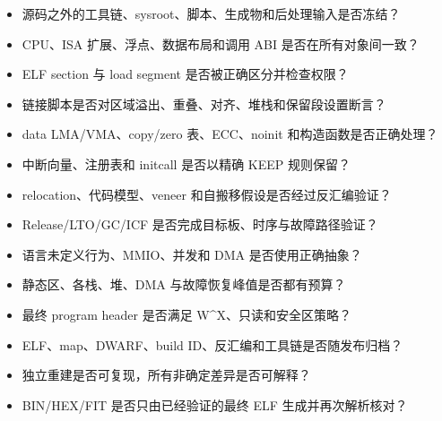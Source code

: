 \begin{itemize}
  \item 源码之外的工具链、sysroot、脚本、生成物和后处理输入是否冻结？
  \item CPU、ISA 扩展、浮点、数据布局和调用 ABI 是否在所有对象间一致？
  \item ELF section 与 load segment 是否被正确区分并检查权限？
  \item 链接脚本是否对区域溢出、重叠、对齐、堆栈和保留段设置断言？
  \item data LMA/VMA、copy/zero 表、ECC、noinit 和构造函数是否正确处理？
  \item 中断向量、注册表和 initcall 是否以精确 KEEP 规则保留？
  \item relocation、代码模型、veneer 和自搬移假设是否经过反汇编验证？
  \item Release/LTO/GC/ICF 是否完成目标板、时序与故障路径验证？
  \item 语言未定义行为、MMIO、并发和 DMA 是否使用正确抽象？
  \item 静态区、各栈、堆、DMA 与故障恢复峰值是否都有预算？
  \item 最终 program header 是否满足 W\textasciicircum X、只读和安全区策略？
  \item ELF、map、DWARF、build ID、反汇编和工具链是否随发布归档？
  \item 独立重建是否可复现，所有非确定差异是否可解释？
  \item BIN/HEX/FIT 是否只由已经验证的最终 ELF 生成并再次解析核对？
\end{itemize}
